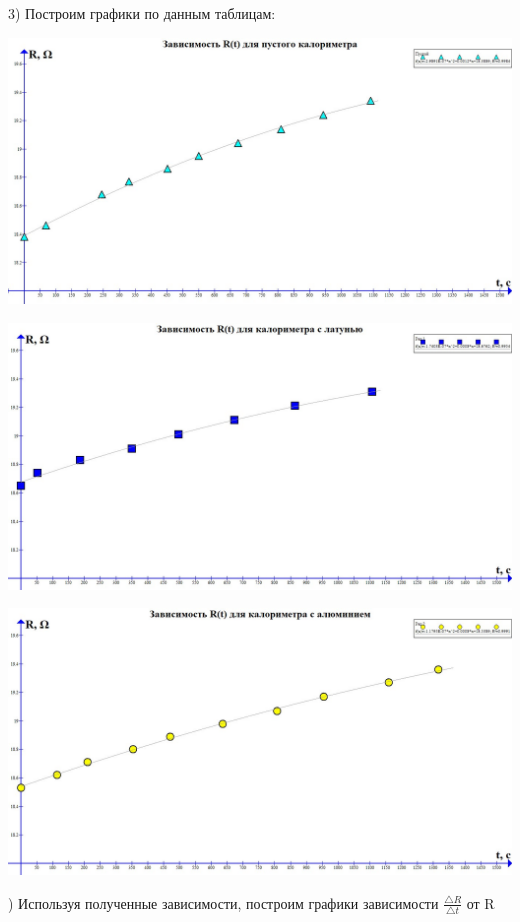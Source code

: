 \documentclass[a4paper,12pt]{article} %
\begin{document}
3) Построим графики по данным таблицам:\\[0.2cm]
\begin{center}
\includegraphics[scale=0.35]{2141}
\end{center}
\newpage
\begin{center}
\includegraphics[scale=0.35]{2142}
\end{center}
\begin{center}
\includegraphics[scale=0.35]{2143}
\end{center}
) Используя полученные зависимости, построим графики зависимости $\frac{\triangle R} {\triangle t}$ от R
\end{document}
